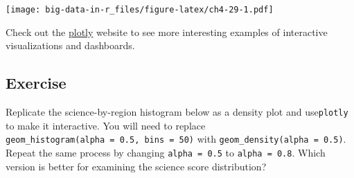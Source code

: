 \documentclass[]{book}
\newenvironment{Shaded}{\begin{snugshade}}{\end{snugshade}}
\newcommand{\DataTypeTok}[1]{\textcolor[rgb]{0.13,0.29,0.53}{#1}}
\newcommand{\KeywordTok}[1]{\textcolor[rgb]{0.13,0.29,0.53}{\textbf{#1}}}
\newcommand{\NormalTok}[1]{#1}
\newcommand{\OperatorTok}[1]{\textcolor[rgb]{0.81,0.36,0.00}{\textbf{#1}}}
\newcommand{\OtherTok}[1]{\textcolor[rgb]{0.56,0.35,0.01}{#1}}
\newcommand{\StringTok}[1]{\textcolor[rgb]{0.31,0.60,0.02}{#1}}
\begin{document}
\begin{Shaded}
\end{Shaded}

\texttt{[image: big-data-in-r\_files/figure-latex/ch4-29-1.pdf]}

Check out the \href{https://plot.ly/r/}{plotly} website to see more interesting examples of interactive visualizations and dashboards.

\hypertarget{exercise-3}{%
\subsection{Exercise}\label{exercise-3}}

Replicate the science-by-region histogram below as a density plot and use\texttt{plotly} to make it interactive. You will need to replace \texttt{geom\_histogram(alpha\ =\ 0.5,\ bins\ =\ 50)} with \texttt{geom\_density(alpha\ =\ 0.5)}. Repeat the same process by changing \texttt{alpha\ =\ 0.5} to \texttt{alpha\ =\ 0.8}. Which version is better for examining the science score distribution?
\end{document}
